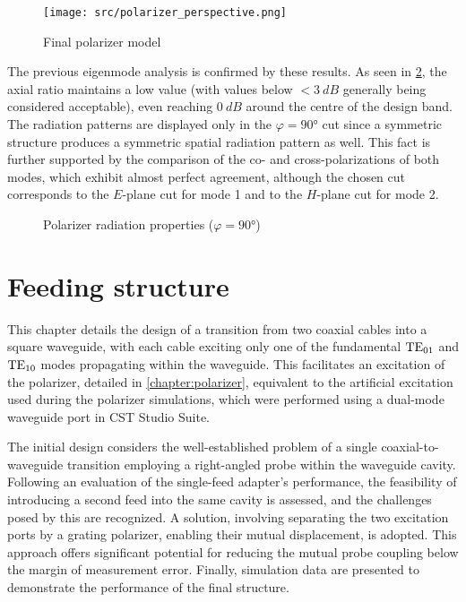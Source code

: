 \documentclass[11pt,a4paper,twoside,openany]{report}
\begin{document}
\begin{figure}[!ht]
    \centering
    \texttt{[image: src/polarizer\_perspective.png]}
    \caption{\label{fig:polarizer-perspective}Final polarizer model}
\end{figure}

The previous eigenmode analysis is confirmed by these results. As seen in \cref{fig:polarizer-radiation}, the axial ratio maintains a low value (with values below $<\qty{3}{dB}$ generally being considered acceptable), even reaching $\qty{0}{dB}$ around the centre of the design band. The radiation patterns are displayed only in the $\varphi = \ang{90}$ cut since a symmetric structure produces a symmetric spatial radiation pattern as well. This fact is further supported by the comparison of the co- and cross-polarizations of both modes, which exhibit almost perfect agreement, although the chosen cut corresponds to the $E$-plane cut for mode 1 and to the $H$-plane cut for mode 2.

\begin{figure}[!ht]
    \centering
    
    \caption{\label{fig:polarizer-radiation}Polarizer radiation properties ($\varphi = \ang{90}$)}
\end{figure}

\chapter{Feeding structure}
\label{chapter:feeding-structure}
This chapter details the design of a transition from two coaxial cables into a square waveguide, with each cable exciting only one of the fundamental $\text{TE}_{01}$ and $\text{TE}_{10}$ modes propagating within the waveguide. This facilitates an excitation of the polarizer, detailed in \cref{chapter:polarizer}, equivalent to the artificial excitation used during the polarizer simulations, which were performed using a dual-mode waveguide port in CST Studio Suite.

The initial design considers the well-established problem of a single coaxial-to-waveguide transition employing a right-angled probe within the waveguide cavity. Following an evaluation of the single-feed adapter's performance, the feasibility of introducing a second feed into the same cavity is assessed, and the challenges posed by this are recognized. A solution, involving separating the two excitation ports by a grating polarizer, enabling their mutual displacement, is adopted. This approach offers significant potential for reducing the mutual probe coupling below the margin of measurement error. Finally, simulation data are presented to demonstrate the performance of the final structure.
\end{document}
